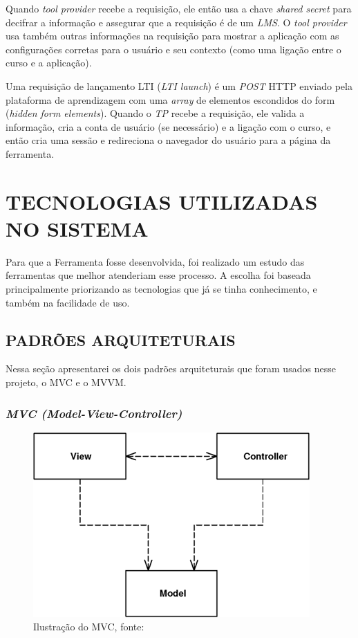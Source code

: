Quando \textit{tool provider} recebe a requisição, ele então usa a chave \textit{shared secret} para decifrar a informação e assegurar que a requisição é de um \textit{LMS}. O \textit{tool provider} usa também outras informações na requisição para mostrar a aplicação com as configurações corretas para o usuário e seu contexto (como uma ligação entre o curso e a aplicação).

Uma requisição de lançamento LTI (\textit{LTI launch}) é um \textit{POST} \ac{HTTP} enviado pela plataforma de aprendizagem com uma \textit{array} de elementos escondidos do form (\textit{hidden form elements}). Quando o \textit{TP} recebe a requisição, ele valida a informação, cria a conta de usuário (se necessário) e a ligação com o curso, e então cria uma sessão e redireciona o navegador do usuário para a página da ferramenta.

\chapter{TECNOLOGIAS UTILIZADAS NO SISTEMA}

Para que a Ferramenta fosse desenvolvida, foi realizado um estudo das ferramentas que melhor atenderiam esse processo. A escolha foi baseada principalmente priorizando as tecnologias que já se tinha conhecimento, e também na facilidade de uso.

\section{PADRÕES ARQUITETURAIS}
Nessa seção apresentarei os dois padrões arquiteturais que foram usados nesse projeto, o \ac{MVC} e o \ac{MVVM}.

\subsection{\textit{MVC (Model-View-Controller)}}
\label{sec:mvc}

    \begin{figure}[h]
        \centering
        \includegraphics[keepaspectratio=true,scale=0.7]{figuras/mvc-fowler.png}
        \caption{Ilustração do \ac{MVC}, fonte: \cite{martin_fowler_patterns}}
        \label{fig:mvc-fowler}
    \end{figure}

